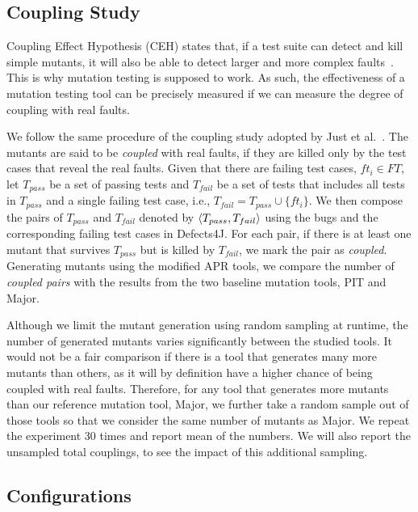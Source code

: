 \documentclass[conference]{IEEEtran}
\def\d4j{Defects4J\xspace}
\begin{document}
\subsection{Coupling Study}
\label{sec:RQ3_coupling_study}

Coupling Effect Hypothesis (CEH) states that, if a test suite can detect and
kill simple mutants, it will also be able to detect larger and more complex
faults~\cite{offutt1992investigations}. This is why mutation testing is supposed
to work. As such, the effectiveness of a mutation testing tool can be precisely
measured if we can measure the degree of coupling with real faults.

We follow the same procedure of the coupling study adopted by Just et
al.~\cite{just2014mutants}. The mutants are said to be \emph{coupled} with real
faults, if they are killed only by the test cases that reveal the real faults.
Given that there are failing test cases, $ft_i \in FT$, let $T_{pass}$ be a set
of passing tests and $T_{fail}$ be a set of tests that includes all tests in
$T_{pass}$ and a single failing test case, i.e., $T_{fail} = T_{pass} \cup
\{ft_i\}$. We then compose the pairs of $T_{pass}$ and $T_{fail}$ denoted by
$\braket{T_{pass}, T_{fail}}$ using the bugs and the corresponding failing test
cases in \d4j. For each pair, if there is at least one mutant that survives
$T_{pass}$ but is killed by $T_{fail}$, we mark the pair as \textit{coupled}. Generating
mutants using the modified APR tools, we compare the number of \textit{coupled pairs}
with the results from the two baseline mutation tools, PIT and Major.

Although we limit the mutant generation using random sampling at runtime, the
number of generated mutants varies significantly between the studied tools. It
would not be a fair comparison if there is a tool that generates many more
mutants than others, as it will by definition have a higher chance of being
coupled with real faults. Therefore, for any tool that generates more mutants
than our reference mutation tool, Major, we further take a random sample out of
those tools so that we consider the same number of mutants as Major. We repeat
the experiment 30 times and report mean of the numbers. We will also report the
unsampled total couplings, to see the impact of this additional sampling.

\subsection{Configurations}
\label{sec:RQ3_config}
\end{document}
